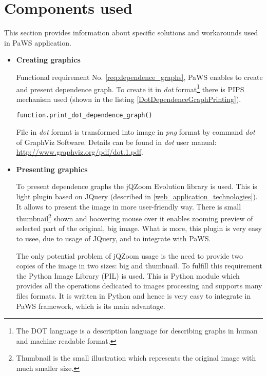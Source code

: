 \section{Components used}
\label{components_used}

This section provides information about specific solutions and workarounds used in PaWS application.

\begin{itemize}
  \item {\bf Creating graphics} 
  
  Functional requirement No. \ref{req:dependence_graphs}, PaWS enables to create and present dependence graph. To create it in \emph{dot} \cite{dot_format} format\footnote{The DOT language is a description language for describing graphs in human and machine readable format.} there is PIPS mechanism used (shown in the listing \ref{DotDependenceGraphPrinting}).
  
  \begin{lstlisting}
function.print_dot_dependence_graph()
  \end{lstlisting}
  
  File in \emph{dot} format is transformed into image in \emph{png} format by command \emph{dot} of GraphViz Software\cite{graphviz}. Details can be found in \emph{dot} user manual: \url{http://www.graphviz.org/pdf/dot.1.pdf}.
  
  \item {\bf Presenting graphics} 
  
  To present dependence graphs the jQZoom Evolution\cite{jqzoom} library is used. This is light plugin based on JQuery (described in \ref{web_application_technologies}). It allows to present the image in more user-friendly way. There is small thumbnail\footnote{Thumbnail is the small illustration which represents the original image with much smaller size.} shown and hoovering mouse over it enables zooming preview of selected part of the original, big image. What is more, this plugin is very easy to usee, due to usage of JQuery, and to integrate with PaWS.
  
  The only potential problem of jQZoom usage is the need to provide two copies of the image in two sizes: big and thumbnail. To fulfill this requirement the Python Image Library (PIL) \cite{pil} is used. This is Python module which provides all the operations dedicated to images processing and supports many files formats. It is written in Python and hence is very easy to integrate in PaWS framework, which is its main advantage.
  

\end{itemize}
